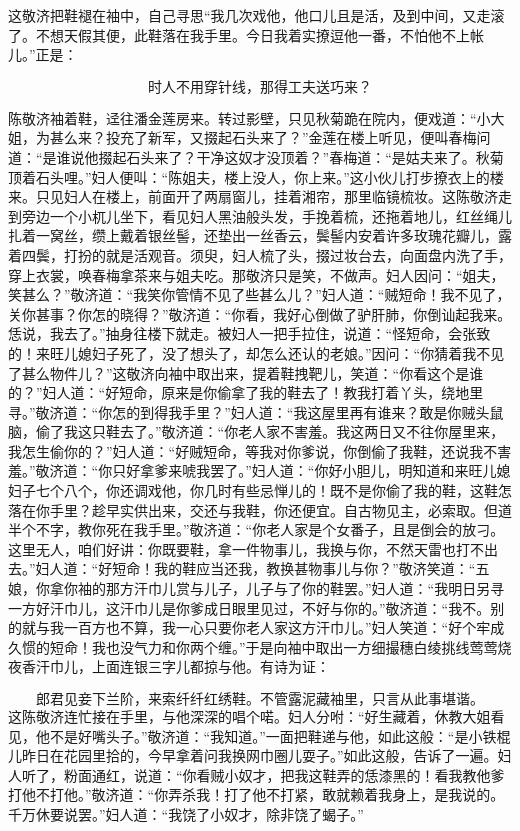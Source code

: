 这敬济把鞋褪在袖中，自己寻思“我几次戏他，他口儿且是活，及到中间，又走滚了。不想天假其便，此鞋落在我手里。今日我着实撩逗他一番，不怕他不上帐儿。”正是：

\[
时人不用穿针线，那得工夫送巧来？
\]

陈敬济袖着鞋，迳往潘金莲房来。转过影壁，只见秋菊跪在院内，便戏道：“小大姐，为甚么来？投充了新军，又掇起石头来了？”金莲在楼上听见，便叫春梅问道：“是谁说他掇起石头来了？干净这奴才没顶着？”春梅道：“是姑夫来了。秋菊顶着石头哩。”妇人便叫：“陈姐夫，楼上没人，你上来。”这小伙儿打步撩衣上的楼来。只见妇人在楼上，前面开了两扇窗儿，挂着湘帘，那里临镜梳妆。这陈敬济走到旁边一个小杌儿坐下，看见妇人黑油般头发，手挽着梳，还拖着地儿，红丝绳儿扎着一窝丝，缵上戴着银丝髻，还垫出一丝香云，鬓髻内安着许多玫瑰花瓣儿，露着四鬓，打扮的就是活观音。须臾，妇人梳了头，掇过妆台去，向面盘内洗了手，穿上衣裳，唤春梅拿茶来与姐夫吃。那敬济只是笑，不做声。妇人因问：“姐夫，笑甚么？”敬济道：“我笑你管情不见了些甚么儿？”妇人道：“贼短命！我不见了，关你甚事？你怎的晓得？”敬济道：“你看，我好心倒做了驴肝肺，你倒讪起我来。恁说，我去了。”抽身往楼下就走。被妇人一把手拉住，说道：“怪短命，会张致的！来旺儿媳妇子死了，没了想头了，却怎么还认的老娘。”因问：“你猜着我不见了甚么物件儿？”这敬济向袖中取出来，提着鞋拽靶儿，笑道：“你看这个是谁的？”妇人道：“好短命，原来是你偷拿了我的鞋去了！教我打着丫头，绕地里寻。”敬济道：“你怎的到得我手里？”妇人道：“我这屋里再有谁来？敢是你贼头鼠脑，偷了我这只鞋去了。”敬济道：“你老人家不害羞。我这两日又不往你屋里来，我怎生偷你的？”妇人道：“好贼短命，等我对你爹说，你倒偷了我鞋，还说我不害羞。”敬济道：“你只好拿爹来唬我罢了。”妇人道：“你好小胆儿，明知道和来旺儿媳妇子七个八个，你还调戏他，你几时有些忌惮儿的！既不是你偷了我的鞋，这鞋怎落在你手里？趁早实供出来，交还与我鞋，你还便宜。自古物见主，必索取。但道半个不字，教你死在我手里。”敬济道：“你老人家是个女番子，且是倒会的放刁。这里无人，咱们好讲：你既要鞋，拿一件物事儿，我换与你，不然天雷也打不出去。”妇人道：“好短命！我的鞋应当还我，教换甚物事儿与你？”敬济笑道：“五娘，你拿你袖的那方汗巾儿赏与儿子，儿子与了你的鞋罢。”妇人道：“我明日另寻一方好汗巾儿，这汗巾儿是你爹成日眼里见过，不好与你的。”敬济道：“我不。别的就与我一百方也不算，我一心只要你老人家这方汗巾儿。”妇人笑道：“好个牢成久惯的短命！我也没气力和你两个缠。”于是向袖中取出一方细撮穗白绫挑线莺莺烧夜香汗巾儿，上面连银三字儿都掠与他。有诗为证：

\[
郎君见妾下兰阶，来索纤纤红绣鞋。
不管露泥藏袖里，只言从此事堪谐。
\]
这陈敬济连忙接在手里，与他深深的唱个喏。妇人分咐：“好生藏着，休教大姐看见，他不是好嘴头子。”敬济道：“我知道。”一面把鞋递与他，如此这般：“是小铁棍儿昨日在花园里拾的，今早拿着问我换网巾圈儿耍子。”如此这般，告诉了一遍。妇人听了，粉面通红，说道：“你看贼小奴才，把我这鞋弄的恁漆黑的！看我教他爹打他不打他。”敬济道：“你弄杀我！打了他不打紧，敢就赖着我身上，是我说的。千万休要说罢。”妇人道：“我饶了小奴才，除非饶了蝎子。”

